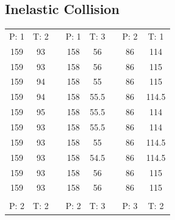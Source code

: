 \documentclass{scrreprt}
\begin{document}
\subsection{Inelastic Collision}
\begin{table}[H]
	\centering
	\begin{tabular}{ccp{1.5cm}ccp{1.5cm}cc}
 P: 1 &   T: 2 &            &  P: 1 &   T: 3 &            &  P: 2 &   T: 1 \\\cline{1-2}\cline{4-5}\cline{7-8}

     159 &         93 &            &      158 &         56 &            &         86 &         114 \\
     159 &         93 &            &      158 &         56 &            &         86 &         115 \\
     159 &         94 &            &      158 &         55 &            &         86 &         115 \\
     159 &         94 &            &      158 &         55.5 &          &         86 &         114.5 \\
     159 &         95 &            &      158 &         55.5 &          &         86 &         114 \\
     159 &         93 &            &      158 &         55.5 &          &         86 &         114 \\
     159 &         93 &            &      158 &         55 &            &         86 &         114.5 \\
     159 &         93 &            &      158 &         54.5 &          &         86 &         114.5 \\
     159 &         93 &            &      158 &         56 &            &         86 &         115 \\
     159 &         93 &            &      158 &         56 &            &         86 &         115 \\
         &            &            &            &            &            &            &            \\

 P: 2 &   T: 2 &            &  P: 2 &   T: 3 &            &  P: 3 &   T: 2 \\\cline{1-2}\cline{4-5}\cline{7-8}


\end{tabular}
\end{table}
\end{document}
